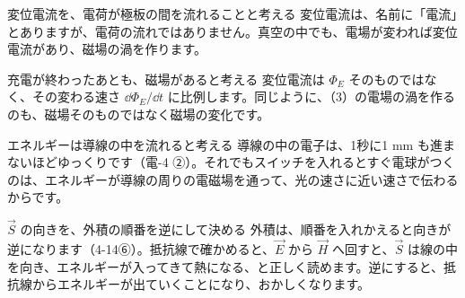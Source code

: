 \begin{tsumazuki}{変位電流を、電荷が極板の間を流れることと考える}
変位電流は、名前に「電流」とありますが、電荷の流れではありません。真空の中でも、電場が変われば変位電流があり、磁場の渦を作ります。
\end{tsumazuki}
\begin{tsumazuki}{充電が終わったあとも、磁場があると考える}
変位電流は $\Phi_E$ そのものではなく、その変わる速さ $\dd\Phi_E/\dd t$ に比例します。同じように、（3）の電場の渦を作るのも、磁場そのものではなく磁場の変化です。
\end{tsumazuki}
\begin{tsumazuki}{エネルギーは導線の中を流れると考える}
導線の中の電子は、1秒に1 mm も進まないほどゆっくりです（電-4 ②）。それでもスイッチを入れるとすぐ電球がつくのは、エネルギーが導線の周りの電磁場を通って、光の速さに近い速さで伝わるからです。
\end{tsumazuki}
\begin{tsumazuki}{$\vec S$ の向きを、外積の順番を逆にして決める}
外積は、順番を入れかえると向きが逆になります（4-14⑥）。抵抗線で確かめると、$\vec E$ から $\vec H$ へ回すと、$\vec S$ は線の中を向き、エネルギーが入ってきて熱になる、と正しく読めます。逆にすると、抵抗線からエネルギーが出ていくことになり、おかしくなります。
\end{tsumazuki}

